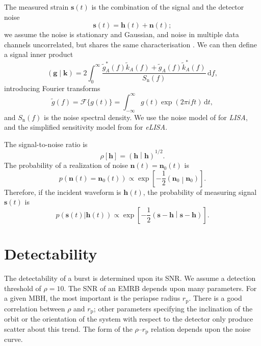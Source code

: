 \documentclass[useAMS,usedcolumn,usegraphicx,usenatbib]{mn2e}
\newcommand{\sub}[1]{\ensuremath{_\mathrm{#1}}}
\newcommand{\dd}{\ensuremath{\mathrm{d}}}
\newcommand{\intd}[4]{\ensuremath{\int_{#1}^{#2}{#3}\,\dd{#4}}}
\newcommand{\recip}[1]{\ensuremath{\frac{1}{#1}}}
\newcommand{\innerprod}[2]{\ensuremath{\left({#1}\middle|{#2}\right)}}
\begin{document}
The measured strain $\boldsymbol{s}(t)$ is the combination of the signal and the detector noise
\begin{equation}
\boldsymbol{s}(t) = \boldsymbol{h}(t) + \boldsymbol{n}(t);
\end{equation}
we assume the noise is stationary and Gaussian, and noise in multiple data channels uncorrelated, but shares the same characterisation \citep{Cutler1998}. We can then define a signal inner product\citep{Cutler1994}
\begin{equation}
\innerprod{\boldsymbol{g}}{\boldsymbol{k}} = 2\intd{0}{\infty}{\frac{\tilde{g}_A^\ast(f)\tilde{k}_A(f) + \tilde{g}_A(f)\tilde{k}_A^\ast(f)}{S\sub{n}(f)}}{f},
\label{eq:inner}
\end{equation}
introducing Fourier transforms
\begin{equation}
\tilde{g}(f) = \mathscr{F}\{g(t)\} = \intd{-\infty}{\infty}{g(t)\exp(2\pi i ft)}{t},
\end{equation}
and $S\sub{n}(f)$ is the noise spectral density. We use the noise model of \citet{Barack2004} for \textit{LISA}, and the simplified sensitivity model from \citet{Jennrich2011} for \textit{eLISA}.

The signal-to-noise ratio is
\begin{equation}
\rho[\boldsymbol{h}] = \innerprod{\boldsymbol{h}}{\boldsymbol{h}}^{1/2}.
\label{eq:SNR}
\end{equation}
The probability of a realization of noise $\boldsymbol{n}(t) = \boldsymbol{n}_0(t)$ is
\begin{equation}
p(\boldsymbol{n}(t) = \boldsymbol{n}_0(t)) \propto \exp\left[-\recip{2}\innerprod{\boldsymbol{n}_0}{\boldsymbol{n}_0}\right].
\end{equation}
Therefore, if the incident waveform is $\boldsymbol{h}(t)$, the probability of measuring signal $\boldsymbol{s}(t)$ is
\begin{equation}
p(\boldsymbol{s}(t)|\boldsymbol{h}(t)) \propto \exp\left[-\recip{2}\innerprod{\boldsymbol{s}-\boldsymbol{h}}{\boldsymbol{s}-\boldsymbol{h}}\right].
\label{eq:sig_prob}
\end{equation}

\section{Detectability}\label{sec:SNR}

The detectability of a burst is determined upon its SNR. We assume a detection threshold of $\rho = 10$. The SNR of an EMRB depends upon many parameters. For a given MBH, the most important is the periapse radius $r\sub{p}$. There is a good correlation between $\rho$ and $r\sub{p}$; other parameters specifying the inclination of the orbit or the orientation of the system with respect to the detector only produce scatter about this trend. The form of the $\rho$--$r\sub{p}$ relation depends upon the noise curve.
\end{document}
